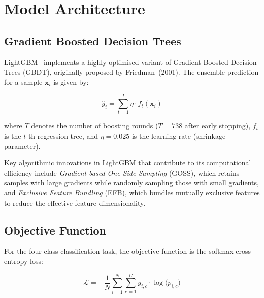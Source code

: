 \documentclass[a4paper,12pt]{article}
\begin{document}
\section{Model Architecture}
\label{sec:architecture}

\subsection{Gradient Boosted Decision Trees}

LightGBM~\cite{lightgbm} implements a highly optimised variant of Gradient Boosted Decision Trees (GBDT), originally proposed by Friedman~(2001). The ensemble prediction for a sample $\mathbf{x}_i$ is given by:

\begin{equation}
\hat{y}_i = \sum_{t=1}^{T} \eta \cdot f_t(\mathbf{x}_i)
\label{eq:gbdt}
\end{equation}

\noindent where $T$ denotes the number of boosting rounds ($T = 738$ after early stopping), $f_t$ is the $t$-th regression tree, and $\eta = 0.025$ is the learning rate (shrinkage parameter).

Key algorithmic innovations in LightGBM that contribute to its computational efficiency include \textit{Gradient-based One-Side Sampling} (GOSS), which retains samples with large gradients while randomly sampling those with small gradients, and \textit{Exclusive Feature Bundling} (EFB), which bundles mutually exclusive features to reduce the effective feature dimensionality.

\subsection{Objective Function}

For the four-class classification task, the objective function is the softmax cross-entropy loss:

\begin{equation}
\mathcal{L} = -\frac{1}{N}\sum_{i=1}^{N}\sum_{c=1}^{C} y_{i,c} \cdot \log\bigl(p_{i,c}\bigr)
\label{eq:loss}
\end{equation}
\end{document}
